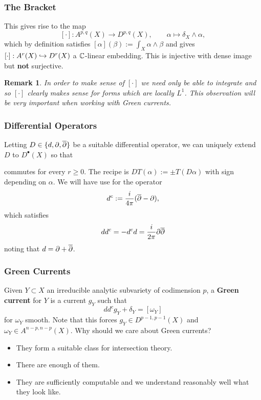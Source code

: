 \documentclass[11pt]{beamer}
\newtheorem{remark}{Remark}
\begin{document}
\begin{frame}
\frametitle{The Bracket}
This gives rise to the map
$$[\cdot]: A^{p,q}(X)\to D^{p,q}(X),\qquad \alpha\mapsto\delta_X\wedge\alpha,$$
which by definition satisfies $[\alpha](\beta):=\int_X\alpha\wedge\beta$ and gives $[\cdot]: A^r(X)\hookrightarrow D^r(X)$ a $\mathbb{C}$-linear embedding. This is injective with dense image but \textbf{not} surjective.

\begin{remark}
In order to make sense of $[\cdot]$ we need only be able to integrate and so $[\cdot]$ clearly makes sense for forms which are locally $L^1$. This observation will be very important when working with Green currents.
\end{remark}
\end{frame}

\begin{frame}[fragile]
\frametitle{Differential Operators}
Letting $D\in\{d,\partial,\overline{\partial}\}$ be a suitable differential operator, we can uniquely extend $D$ to $D^{\bullet}(X)$ so that 
\begin{center}
\end{center}
commutes for every $r\geq0$. The recipe is $DT(\alpha):=\pm T(D\alpha)$ with sign depending on $\alpha$. We will have use for the operator
$$d^c:=\dfrac{i}{4\pi}(\overline{\partial}-\partial),$$
which satisfies
$$dd^c=-d^cd=\dfrac{i}{2\pi}\partial\overline{\partial}$$
noting that $d=\partial+\overline{\partial}$.
\end{frame}

\begin{frame}
\frametitle{Green Currents}
Given $Y\subset X$ an irreducible analytic subvariety of codimension $p$, a \textbf{Green current} for $Y$ is a current $g_Y$ such that 
$$dd^cg_Y+\delta_Y=[\omega_Y]$$
for $\omega_Y$ smooth. Note that this forces $g_Y\in D^{p-1,p-1}(X)$ and $\omega_Y\in A^{n-p,n-p}(X)$. Why should we care about Green currents?
\begin{itemize}
\item They form a suitable class for intersection theory.

\item There are enough of them. 

\item They are sufficiently computable and we understand reasonably well what they look like.
\end{itemize}
\end{frame}
\end{document}
